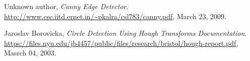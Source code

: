 \begin{thebibliography}{9}

  Unknown author,
  \emph{Canny Edge Detector}.
  \url{http://www.cse.iitd.ernet.in/~pkalra/csl783/canny.pdf},
  March 23, 2009.

  Jaroslav Borovicka,
  \emph{Circle Detection Using Hough Transforms Documentation}.
  \url{https://files.nyu.edu/jb4457/public/files/research/bristol/hough-report.pdf},
  Masrch 04, 2003.


\end{thebibliography}